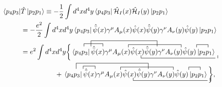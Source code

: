 \documentclass{article}
\begin{document}
\begin{equation}
\label{eq:mollerContraction}
\begin{aligned}
    \bra{p_4p_3}&\hat{T}\ket{p_2p_1}
    \equiv
    -\frac{1}{2} \int d^4x d^4y
    \bra{p_4p_3} \hat{\mathcal{H}}_I(x)\hat{\mathcal{H}}_I(y)\ket{p_2p_1}
    \\&=
    -\frac{e^2}{2}\int d^4x d^4y
    \bra{p_4p_3}
    \hat{\bar{\psi}}(x)\gamma^\mu A_\mu(x) \hat{\psi}(x)
    \hat{\bar{\psi}}(y)\gamma^\nu A_\nu(y) \hat{\psi}(y)
    \ket{p_2p_1}
    \\&=
    e^2\int d^4x d^4y\bigg\{
    \contraction[1ex]
        {\langle}{\hat{\bar{p}}_4}{p_3|}{\hat{\bar{\psi}}(x)}
    \contraction[2ex]
        {\langle p_4}{\bar{\psi}_3}
        {|\hat{\bar{\psi}}(x)\gamma^\mu A_\mu(x)\hat{\psi}(x)}
        {\bar{\hat{\psi}}(y)}
    \contraction[1ex]
        {\bra{p_4p_3}
        \hat{\bar{\psi}}(x)\gamma^\mu}{A_\mu(x)}
        {\hat{\psi}(x) \hat{\bar{\psi}}(y)\gamma^\nu}{A_\nu(y)}
    \bcontraction[1ex]
        {\bra{p_4p_3}
        \hat{\bar{\psi}}(x)\gamma^\mu A_\mu(x)}{\hat{\psi}(}
        {x)\hat{\bar{\psi}}(y)\gamma^\nu A_\nu(y) \hat{\psi}(y)||p_2}
        {p}
    \contraction[1ex]
        {\bra{p_4p_3}
        \hat{\bar{\psi}}(x)\gamma^\mu A_\mu(x) \hat{\psi}(x)
        \hat{\bar{\psi}}(y)\gamma^\nu A_\nu(y)}{\hat{w}(y)}
        {}{|p_2}
    \bra{p_4p_3}
    \hat{\bar{\psi}}(x)\gamma^\mu A_\mu(x) \hat{\psi}(x)
    \hat{\bar{\psi}}(y)\gamma^\nu A_\nu(y) \hat{\psi}(y)
    \ket{p_2p_1}
    \\&\qquad\qquad\quad+
    \contraction[2ex]
        {\langle}{\hat{\bar{p}}_4} {p_3|
        \hat{\bar{\psi}}(x)\gamma^\mu A_\mu(x) \hat{\psi}(x)}
        {\hat{\bar{\psi}}(y)}
    \contraction[1ex]
        {\langle p_4}{\bar{\psi}_3}{}
        {|\hat{\bar{\psi}}(x)}
    \contraction[1ex]
        {\bra{p_4p_3}
        \hat{\bar{\psi}}(x)\gamma^\mu}{A_\mu(x)}
        {\hat{\psi}(x) \hat{\bar{\psi}}(y)\gamma^\nu}{A_\nu(y)}
    \bcontraction[1ex]
        {\bra{p_4p_3}
        \hat{\bar{\psi}}(x)\gamma^\mu A_\mu(x)}{\hat{\psi}(}
        {x)\hat{\bar{\psi}}(y)\gamma^\nu A_\nu(y) \hat{\psi}(y)||p_2}
        {p}
    \contraction[1ex]
        {\bra{p_4p_3}
        \hat{\bar{\psi}}(x)\gamma^\mu A_\mu(x) \hat{\psi}(x)
        \hat{\bar{\psi}}(y)\gamma^\nu A_\nu(y)}{\hat{w}(y)}
        {}{|p_2}
    \bra{p_4p_3}
    \hat{\bar{\psi}}(x)\gamma^\mu A_\mu(x) \hat{\psi}(x)
    \hat{\bar{\psi}}(y)\gamma^\nu A_\nu(y) \hat{\psi}(y)
    \ket{p_2p_1}
    \bigg\},
\end{aligned}
\end{equation}
%
\end{document}
